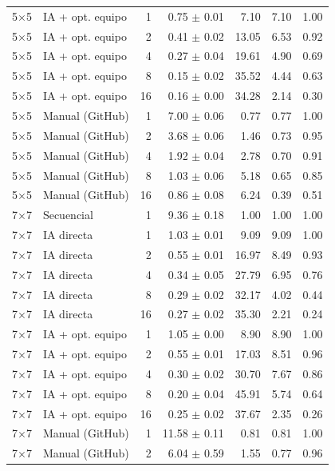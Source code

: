 \begin{tabular}{llrrrrr}
5$\times$5 & IA + opt. equipo & 1 & 0.75 $\pm$ 0.01 & 7.10 & 7.10 & 1.00 \\
5$\times$5 & IA + opt. equipo & 2 & 0.41 $\pm$ 0.02 & 13.05 & 6.53 & 0.92 \\
5$\times$5 & IA + opt. equipo & 4 & 0.27 $\pm$ 0.04 & 19.61 & 4.90 & 0.69 \\
5$\times$5 & IA + opt. equipo & 8 & 0.15 $\pm$ 0.02 & 35.52 & 4.44 & 0.63 \\
5$\times$5 & IA + opt. equipo & 16 & 0.16 $\pm$ 0.00 & 34.28 & 2.14 & 0.30 \\
5$\times$5 & Manual (GitHub) & 1 & 7.00 $\pm$ 0.06 & 0.77 & 0.77 & 1.00 \\
5$\times$5 & Manual (GitHub) & 2 & 3.68 $\pm$ 0.06 & 1.46 & 0.73 & 0.95 \\
5$\times$5 & Manual (GitHub) & 4 & 1.92 $\pm$ 0.04 & 2.78 & 0.70 & 0.91 \\
5$\times$5 & Manual (GitHub) & 8 & 1.03 $\pm$ 0.06 & 5.18 & 0.65 & 0.85 \\
5$\times$5 & Manual (GitHub) & 16 & 0.86 $\pm$ 0.08 & 6.24 & 0.39 & 0.51 \\
\midrule
7$\times$7 & Secuencial & 1 & 9.36 $\pm$ 0.18 & 1.00 & 1.00 & 1.00 \\
7$\times$7 & IA directa & 1 & 1.03 $\pm$ 0.01 & 9.09 & 9.09 & 1.00 \\
7$\times$7 & IA directa & 2 & 0.55 $\pm$ 0.01 & 16.97 & 8.49 & 0.93 \\
7$\times$7 & IA directa & 4 & 0.34 $\pm$ 0.05 & 27.79 & 6.95 & 0.76 \\
7$\times$7 & IA directa & 8 & 0.29 $\pm$ 0.02 & 32.17 & 4.02 & 0.44 \\
7$\times$7 & IA directa & 16 & 0.27 $\pm$ 0.02 & 35.30 & 2.21 & 0.24 \\
7$\times$7 & IA + opt. equipo & 1 & 1.05 $\pm$ 0.00 & 8.90 & 8.90 & 1.00 \\
7$\times$7 & IA + opt. equipo & 2 & 0.55 $\pm$ 0.01 & 17.03 & 8.51 & 0.96 \\
7$\times$7 & IA + opt. equipo & 4 & 0.30 $\pm$ 0.02 & 30.70 & 7.67 & 0.86 \\
7$\times$7 & IA + opt. equipo & 8 & 0.20 $\pm$ 0.04 & 45.91 & 5.74 & 0.64 \\
7$\times$7 & IA + opt. equipo & 16 & 0.25 $\pm$ 0.02 & 37.67 & 2.35 & 0.26 \\
7$\times$7 & Manual (GitHub) & 1 & 11.58 $\pm$ 0.11 & 0.81 & 0.81 & 1.00 \\
7$\times$7 & Manual (GitHub) & 2 & 6.04 $\pm$ 0.59 & 1.55 & 0.77 & 0.96 \\

\end{tabular}
